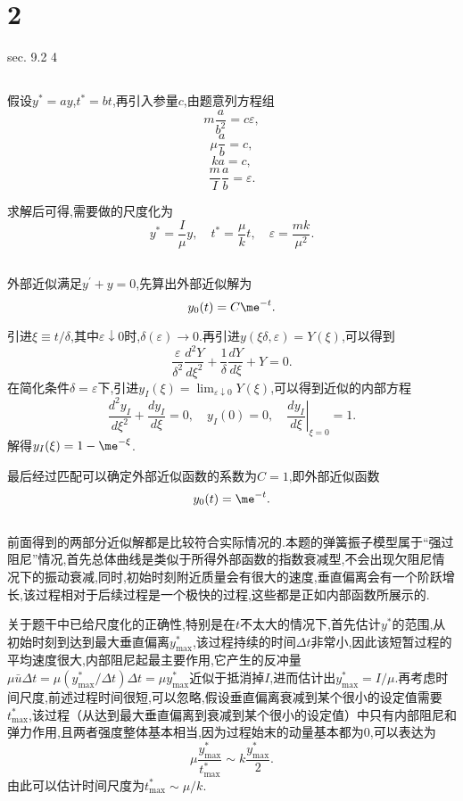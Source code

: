 \documentclass[12pt]{article}
\begin{document}
\section{2}

sec. 9.2 4


\subsection{}

假设$y^{*}=a y$,$t^{*}=b t$,再引入参量$c$,由题意列方程组
$$m \frac{a}{b^{2}}=c \varepsilon,$$
$$\mu \frac{a}{b}=c,$$
$$k a=c,$$
$$\frac{m}{I} \frac{a}{b}=\varepsilon.$$

求解后可得,需要做的尺度化为
$$
y^{*}=\frac{I}{\mu} y, \quad t^{*}=\frac{\mu}{k} t, \quad \varepsilon=\frac{m k}{\mu^{2}}.
$$
\subsection{}
外部近似满足$y^{\prime}+y=0$,先算出外部近似解为
$$
y_{0}(t)=C \me^{-t}.
$$

引进$\xi \equiv t / \delta$,其中$\varepsilon \downarrow 0$时,$\delta(\varepsilon) \rightarrow 0$.再引进$y(\xi \delta, \varepsilon)=Y(\xi)$,可以得到
$$
\frac{\varepsilon}{\delta^{2}} \frac{d^{2} Y}{d \xi^{2}}+\frac{1}{\delta} \frac{d Y}{d \xi}+Y=0.
$$
在简化条件$\delta=\varepsilon$下,引进$y_{I}(\xi)=\lim _{\varepsilon \downarrow 0} Y(\xi)$,可以得到近似的内部方程
$$
\frac{d^{2} y_{I}}{d \xi^{2}}+\frac{d y_{I}}{d \xi}=0, \quad y_{I}(0)=0,\left.\quad \frac{d y_{I}}{d \xi}\right|_{\xi=0}=1.
$$
解得$y_{I}(\xi)=1-\me^{-\xi}$.

最后经过匹配可以确定外部近似函数的系数为$C=1$,即外部近似函数
$$
y_{0}(t)=\me^{-t}.
$$

\subsection{}
前面得到的两部分近似解都是比较符合实际情况的.本题的弹簧振子模型属于“强过阻尼”情况,首先总体曲线是类似于所得外部函数的指数衰减型,不会出现欠阻尼情况下的振动衰减,同时,初始时刻附近质量会有很大的速度,垂直偏离会有一个阶跃增长,该过程相对于后续过程是一个极快的过程,这些都是正如内部函数所展示的.

关于题干中已给尺度化的正确性,特别是在$t$不太大的情况下,首先估计$y^*$的范围,从初始时刻到达到最大垂直偏离$y_{\max }^{*}$,该过程持续的时间$\Delta t$非常小,因此该短暂过程的平均速度很大,内部阻尼起最主要作用,它产生的反冲量$\mu \bar{u} \Delta t=\mu\left(y_{\max }^{*} / \Delta t\right) \Delta t=\mu y_{\max }^{*}$近似于抵消掉$I$,进而估计出$y_{\max }^{*}=I / \mu$.再考虑时间尺度,前述过程时间很短,可以忽略,假设垂直偏离衰减到某个很小的设定值需要$t_{\max }^{*}$,该过程（从达到最大垂直偏离到衰减到某个很小的设定值）中只有内部阻尼和弹力作用,且两者强度整体基本相当,因为过程始末的动量基本都为0,可以表达为
$$
\mu \frac{y_{\max }^{*}}{t_{\max }^{*}} \sim k \frac{y_{\max }^{*}}{2}.
$$
由此可以估计时间尺度为$t_{\max }^{*} \sim \mu / k$.
\end{document}
